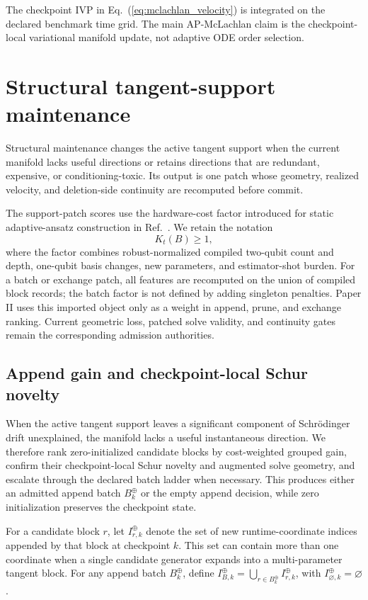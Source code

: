 \documentclass[
  reprint,
  amsmath,
  amssymb,
  aps,
  pra,
  nofootinbib,
  superscriptaddress,
  floatfix
]{revtex4-2}
\begin{document}
The checkpoint IVP in Eq.~(\ref{eq:mclachlan_velocity}) is integrated on the declared benchmark time grid.  The main AP-McLachlan claim is the checkpoint-local variational manifold update, not adaptive ODE order selection.

\section{Structural tangent-support maintenance}
\label{sec:structural_support}

Structural maintenance changes the active tangent support when the current manifold lacks useful directions or retains directions that are redundant, expensive, or conditioning-toxic.  Its output is one patch whose geometry, realized velocity, and deletion-side continuity are recomputed before commit.

The support-patch scores use the hardware-cost factor introduced for static adaptive-ansatz construction in Ref.~\cite{Strobel2026StaticAdapt}.  We retain the notation
\begin{equation}
K_t(B)\ge 1,
\label{eq:imported_cost_factor}
\end{equation}
where the factor combines robust-normalized compiled two-qubit count and depth, one-qubit basis changes, new parameters, and estimator-shot burden.  For a batch or exchange patch, all features are recomputed on the union of compiled block records; the batch factor is not defined by adding singleton penalties.  Paper II uses this imported object only as a weight in append, prune, and exchange ranking.  Current geometric loss, patched solve validity, and continuity gates remain the corresponding admission authorities.
\subsection{Append gain and checkpoint-local Schur novelty}
When the active tangent support leaves a significant component of Schr\"odinger drift unexplained, the manifold lacks a useful instantaneous direction.  We therefore rank zero-initialized candidate blocks by cost-weighted grouped gain, confirm their checkpoint-local Schur novelty and augmented solve geometry, and escalate through the declared batch ladder when necessary.  This produces either an admitted append batch $B_k^{\oplus}$ or the empty append decision, while zero initialization preserves the checkpoint state.

For a candidate block $r$, let $I_{r,k}^{\oplus}$ denote the set of new runtime-coordinate indices appended by that block at checkpoint $k$.  This set can contain more than one coordinate when a single candidate generator expands into a multi-parameter tangent block. For any append batch $B_k^{\oplus}$, define $I_{B,k}^{\oplus}=\bigcup_{r\in B_k^{\oplus}}I_{r,k}^{\oplus}$, with $I_{\varnothing,k}^{\oplus}=\varnothing$.
\end{document}
